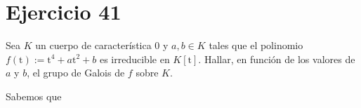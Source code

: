 \section{Ejercicio 41}
\begin{enun}
    Sea $K$ un cuerpo de característica $0$ y $a, b \in K$ tales que el polinomio $f\left( \mathrm{t} \right) := \mathrm{t}^4 + a \mathrm{t}^2 + b$ es irreducible en $K\left[\mathrm{t}\right]$.
    Hallar, en función de los valores de $a$ y $b$, el grupo de Galois de $f$ sobre $K$.
\end{enun}

\begin{sol}
    Sabemos que 
\end{sol}
